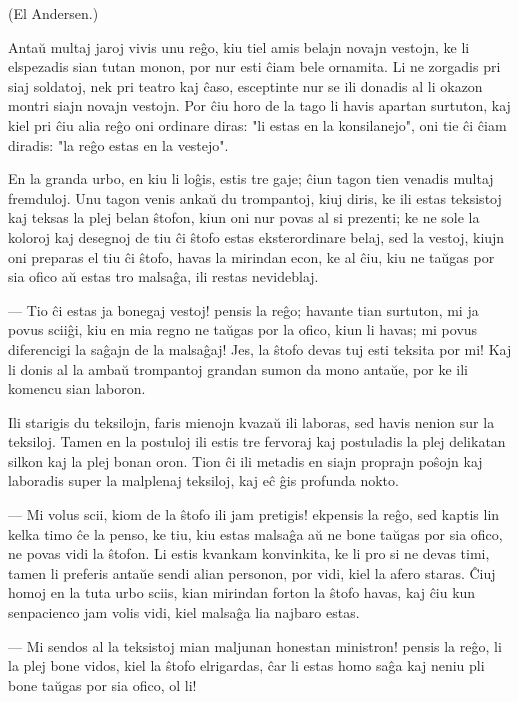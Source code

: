 \begin{center}
\footnotesize (El Andersen.)
\end{center}

   Anta\u u multaj jaroj vivis unu re\^go, kiu tiel amis belajn novajn
vestojn, ke li elspezadis sian tutan monon, por nur esti \^ciam bele
ornamita. Li ne zorgadis pri siaj soldatoj, nek pri teatro kaj
\^caso, esceptinte nur se ili donadis al li okazon montri siajn
novajn vestojn. Por \^ciu horo de la tago li havis apartan surtuton,
kaj kiel pri \^ciu alia re\^go oni ordinare diras: "li estas en la
konsilanejo", oni tie \^ci \^ciam diradis: "la re\^go estas en la
vestejo".

   En la granda urbo, en kiu li lo\^gis, estis tre gaje; \^ciun tagon tien
venadis multaj fremduloj. Unu tagon venis anka\u u du trompantoj,
kiuj diris, ke ili estas teksistoj kaj teksas la plej belan
\^stofon, kiun oni nur povas al si prezenti; ke ne sole la koloroj
kaj desegnoj de tiu \^ci \^stofo estas eksterordinare belaj, sed la
vestoj, kiujn oni preparas el tiu \^ci \^stofo, havas la mirindan
econ, ke al \^ciu, kiu ne ta\u ugas por sia ofico a\u u estas tro
malsa\^ga, ili restas nevideblaj.

 --- Tio \^ci estas ja bonegaj vestoj! pensis la re\^go; havante tian
surtuton, mi ja povus scii\^gi, kiu en mia regno ne ta\u ugas por la
ofico, kiun li havas; mi povus diferencigi la sa\^gajn de la
malsa\^gaj! Jes, la \^stofo devas tuj esti teksita por mi! Kaj li
donis al la amba\u u trompantoj grandan sumon da mono anta\u ue, por
ke ili komencu sian laboron.

   Ili starigis du teksilojn, faris mienojn kvaza\u u ili laboras, sed
havis nenion sur la teksiloj. Tamen en la postuloj ili estis tre
fervoraj kaj postuladis la plej delikatan silkon kaj la plej bonan
oron. Tion \^ci ili metadis en siajn proprajn po\^sojn kaj laboradis
super la malplenaj teksiloj, kaj e\^c \^gis profunda nokto.

 --- Mi volus scii, kiom de la \^stofo ili jam pretigis! ekpensis
la re\^go, sed kaptis lin kelka timo \^ce la penso, ke tiu, kiu
estas malsa\^ga a\u u ne bone ta\u ugas por sia ofico, ne povas vidi
la \^stofon. Li estis kvankam konvinkita, ke li pro si ne devas
timi, tamen li preferis anta\u ue sendi alian personon, por vidi,
kiel la afero staras. \^Ciuj homoj en la tuta urbo sciis, kian
mirindan forton la \^stofo havas, kaj \^ciu kun senpacienco jam
volis vidi, kiel malsa\^ga lia najbaro estas.

 --- Mi sendos al la teksistoj mian maljunan honestan ministron! pensis
la re\^go, li la plej bone vidos, kiel la \^stofo elrigardas, \^car
li estas homo sa\^ga kaj neniu pli bone ta\u ugas por sia ofico, ol
li!

